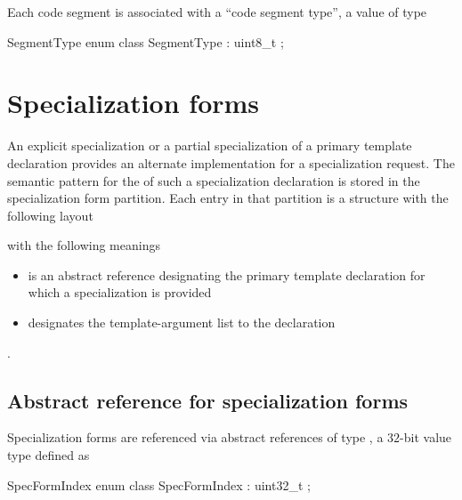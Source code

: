 Each code segment is associated with a ``code segment type'', a value of type
%
\begin{typedef}{SegmentType}{}
	enum class SegmentType : uint8_t { };
\end{typedef}




\section{Specialization forms}
\label{sec:ifc-specialization-forms}

An explicit specialization or a partial specialization of a primary template declaration
provides an alternate implementation for a specialization request.
The semantic pattern for the  of such a specialization declaration is 
stored in the specialization form partition.
Each entry in that partition is a structure with the following layout
%
\begin{figure}[H]
	\centering
\end{figure}
%
with the following meanings
\begin{itemize}
	\item {} is an abstract reference designating the primary template declaration for which a specialization is provided
	\item {} designates the template-argument list to the  declaration 
\end{itemize}


.

\subsection{Abstract reference for specialization forms}
\label{sec:ifc-spec-form-index}

Specialization forms are referenced via abstract references of type ,
a $32$-bit value type defined as
%
\begin{typedef}{SpecFormIndex}{}
	enum class SpecFormIndex : uint32_t { };
\end{typedef}
%
